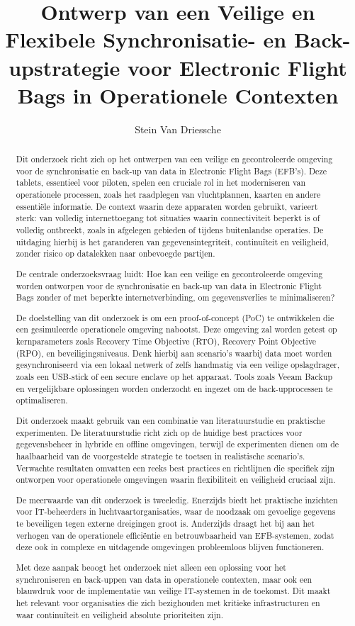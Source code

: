 \documentclass{hogent-article}
\title{Ontwerp van een Veilige en Flexibele Synchronisatie- en Back-upstrategie voor Electronic Flight Bags in Operationele Contexten}
\author{Stein Van Driessche}
\begin{document}
    
    \begin{abstract}
Dit onderzoek richt zich op het ontwerpen van een veilige en gecontroleerde omgeving voor de synchronisatie en back-up van data in Electronic Flight Bags (EFB's). Deze tablets, essentieel voor piloten, spelen een cruciale rol in het moderniseren van operationele processen, zoals het raadplegen van vluchtplannen, kaarten en andere essentiële informatie. De context waarin deze apparaten worden gebruikt, varieert sterk: van volledig internettoegang tot situaties waarin connectiviteit beperkt is of volledig ontbreekt, zoals in afgelegen gebieden of tijdens buitenlandse operaties. De uitdaging hierbij is het garanderen van gegevensintegriteit, continuïteit en veiligheid, zonder risico op datalekken naar onbevoegde partijen.

De centrale onderzoeksvraag luidt: Hoe kan een veilige en gecontroleerde omgeving worden ontworpen voor de synchronisatie en back-up van data in Electronic Flight Bags zonder of met beperkte internetverbinding, om gegevensverlies te minimaliseren?

De doelstelling van dit onderzoek is om een proof-of-concept (PoC) te ontwikkelen die een gesimuleerde operationele omgeving nabootst. Deze omgeving zal worden getest op kernparameters zoals Recovery Time Objective (RTO), Recovery Point Objective (RPO), en beveiligingsniveaus. Denk hierbij aan scenario's waarbij data moet worden gesynchroniseerd via een lokaal netwerk of zelfs handmatig via een veilige opslagdrager, zoals een USB-stick of een secure enclave op het apparaat. Tools zoals Veeam Backup en vergelijkbare oplossingen worden onderzocht en ingezet om de back-upprocessen te optimaliseren.

Dit onderzoek maakt gebruik van een combinatie van literatuurstudie en praktische experimenten. De literatuurstudie richt zich op de huidige best practices voor gegevensbeheer in hybride en offline omgevingen, terwijl de experimenten dienen om de haalbaarheid van de voorgestelde strategie te toetsen in realistische scenario's. Verwachte resultaten omvatten een reeks best practices en richtlijnen die specifiek zijn ontworpen voor operationele omgevingen waarin flexibiliteit en veiligheid cruciaal zijn.

De meerwaarde van dit onderzoek is tweeledig. Enerzijds biedt het praktische inzichten voor IT-beheerders in luchtvaartorganisaties, waar de noodzaak om gevoelige gegevens te beveiligen tegen externe dreigingen groot is. Anderzijds draagt het bij aan het verhogen van de operationele efficiëntie en betrouwbaarheid van EFB-systemen, zodat deze ook in complexe en uitdagende omgevingen probleemloos blijven functioneren.

Met deze aanpak beoogt het onderzoek niet alleen een oplossing voor het synchroniseren en back-uppen van data in operationele contexten, maar ook een blauwdruk voor de implementatie van veilige IT-systemen in de toekomst. Dit maakt het relevant voor organisaties die zich bezighouden met kritieke infrastructuren en waar continuïteit en veiligheid absolute prioriteiten zijn.
    \end{abstract}
    
    \tableofcontents
    
    
    
    \printbibliography[heading=bibintoc]
    
\end{document}
